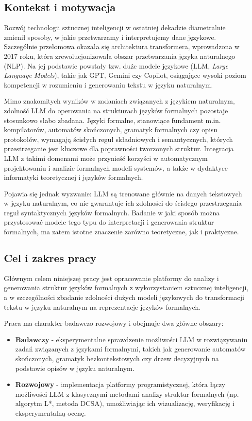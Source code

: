 \documentclass[12pt]{article}
\begin{document}
\subsection{Kontekst i motywacja}

Rozwój technologii sztucznej inteligencji w ostatniej dekadzie diametralnie zmienił sposoby, w jakie przetwarzamy i interpretujemy dane językowe. Szczególnie przełomowa okazała się architektura transformera, wprowadzona w 2017 roku, która zrewolucjonizowała obszar przetwarzania języka naturalnego (NLP). Na jej podstawie powstały tzw. duże modele językowe (LLM, \textit{Large Language Models}), takie jak GPT, Gemini czy Copilot, osiągające wysoki poziom kompetencji w rozumieniu i generowaniu tekstu w języku naturalnym.

Mimo znakomitych wyników w zadaniach związanych z językiem naturalnym, zdolność LLM do operowania na strukturach języków formalnych pozostaje stosunkowo słabo zbadana. Języki formalne, stanowiące fundament m.in. kompilatorów, automatów skończonych, gramatyk formalnych czy opisu protokołów, wymagają ścisłych reguł składniowych i semantycznych, których przestrzeganie jest kluczowe dla poprawności tworzonych struktur. Integracja LLM z takimi domenami może przynieść korzyści w automatycznym projektowaniu i analizie formalnych modeli systemów, a także w dydaktyce informatyki teoretycznej i języków formalnych.

Pojawia się jednak wyzwanie: LLM są trenowane głównie na danych tekstowych w języku naturalnym, co nie gwarantuje ich zdolności do ścisłego przestrzegania reguł syntaktycznych języków formalnych. Badanie w jaki sposób można przystosować modele tego typu do interpretacji i generowania struktur formalnych, ma zatem istotne znaczenie zarówno teoretyczne, jak i praktyczne.

\subsection{Cel i zakres pracy}

Głównym celem niniejszej pracy jest opracowanie platformy do analizy i generowania struktur języków formalnych z wykorzystaniem sztucznej inteligencji, a w szczególności zbadanie zdolności dużych modeli językowych do transformacji tekstu w języku naturalnym na reprezentacje języków formalnych.

Praca ma charakter badawczo-rozwojowy i obejmuje dwa główne obszary:

\begin{itemize}
    \item \textbf{Badawczy} - eksperymentalne sprawdzenie możliwości LLM w rozwiązywaniu zadań związanych z językami formalnymi, takich jak generowanie automatów skończonych, gramatyk bezkontekstowych czy drzew decyzyjnych na podstawie opisów w języku naturalnym.
    
    \item \textbf{Rozwojowy} - implementacja platformy programistycznej, która łączy możliwości LLM z klasycznymi metodami analizy struktur formalnych (np. algorytm L*, metoda DCSA), umożliwiając ich wizualizację, weryfikację i eksperymentalną ocenę.
\end{itemize}
\end{document}
